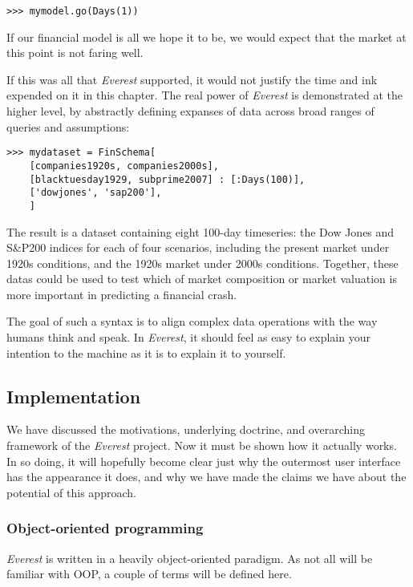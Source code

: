 \documentclass[a4paper,11pt,oneside]{book}
\begin{document}
\begin{verbatim}
>>> mymodel.go(Days(1))
\end{verbatim}

If our financial model is all we hope it to be, we would expect that the market at this point is not faring well.

If this was all that \textit{Everest} supported, it would not justify the time and ink expended on it in this chapter. The real power of \textit{Everest} is demonstrated at the higher level, by abstractly defining expanses of data across broad ranges of queries and assumptions:

\begin{verbatim}
>>> mydataset = FinSchema[
    [companies1920s, companies2000s],
    [blacktuesday1929, subprime2007] : [:Days(100)],
    ['dowjones', 'sap200'],
    ]
\end{verbatim}

The result is a dataset containing eight 100-day timeseries: the Dow Jones and S\&P200 indices for each of four scenarios, including the present market under 1920s conditions, and the 1920s market under 2000s conditions. Together, these datas could be used to test which of market composition or market valuation is more important in predicting a financial crash.

The goal of such a syntax is to align complex data operations with the way humans think and speak. In \textit{Everest}, it should feel as easy to explain your intention to the machine as it is to explain it to yourself.

\subsection{Implementation}

We have discussed the motivations, underlying doctrine, and overarching framework of the \textit{Everest} project. Now it must be shown how it actually works. In so doing, it will hopefully become clear just why the outermost user interface has the appearance it does, and why we have made the claims we have about the potential of this approach.

\subsubsection{Object-oriented programming}

\textit{Everest} is written in a heavily object-oriented paradigm. As not all will be familiar with OOP, a couple of terms will be defined here.
\end{document}
